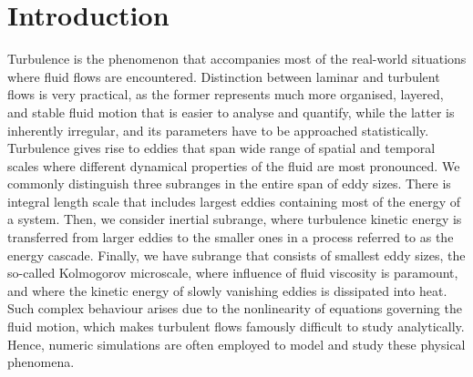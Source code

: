 \documentclass{pracamgren}
\begin{document}
\chapter*{Introduction}
\label{ch:int}

Turbulence is the phenomenon that accompanies most of the real-world situations where fluid flows are encountered.
Distinction between laminar and turbulent flows is very practical, as the former represents much more organised, layered, and stable fluid motion that is easier to analyse and quantify, while the latter is inherently irregular, and its parameters have to be approached statistically.
Turbulence gives rise to eddies that span wide range of spatial and temporal scales where different dynamical properties of the fluid are most pronounced.
We commonly distinguish three subranges in the entire span of eddy sizes.
There is integral length scale that includes largest eddies containing most of the energy of a system.
Then, we consider inertial subrange, where turbulence kinetic energy is transferred from larger eddies to the smaller ones in a process referred to as the energy cascade.
Finally, we have subrange that consists of smallest eddy sizes, the so-called Kolmogorov microscale, where influence of fluid viscosity is paramount, and where the kinetic energy of slowly vanishing eddies is dissipated into heat.
Such complex behaviour arises due to the nonlinearity of equations governing the fluid motion, which makes turbulent flows famously difficult to study analytically.
Hence, numeric simulations are often employed to model and study these physical phenomena.
\end{document}
